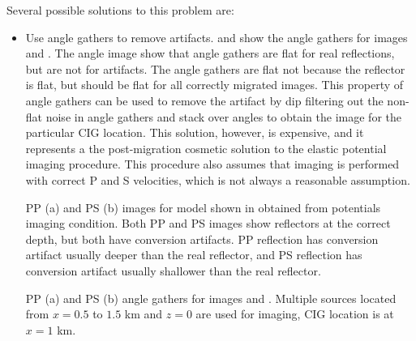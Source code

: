 Several possible solutions to this problem are:
\begin{itemize}
\item Use angle gathers to remove artifacts.  and  show the angle gathers for images  and . The angle image show that angle gathers are flat for real reflections, but are not for artifacts. The angle gathers are flat not because the reflector is flat, but should be flat for all correctly migrated images. This property of angle gathers can be used to remove the artifact by dip filtering out the non-flat noise in angle gathers and stack over angles to obtain the image for the particular CIG location.
This solution, however, is expensive, and it represents a the post-migration cosmetic solution to the elastic potential imaging procedure. This procedure also assumes that imaging is performed with correct P and S velocities, which is not always a reasonable assumption.





{PP (a) and PS (b) images for model shown in  obtained from potentials imaging condition. Both PP and PS images show reflectors at the correct depth, but both have conversion artifacts. PP reflection has conversion artifact usually deeper than the real reflector, and PS reflection has conversion artifact usually shallower than the real reflector. }

{PP (a) and PS (b) angle gathers for images 
and . Multiple sources located from $x=0.5$ to $1.5$ km and
$z=0$ are used for imaging, CIG location is at $x=1$ km.
}



\end{itemize}
